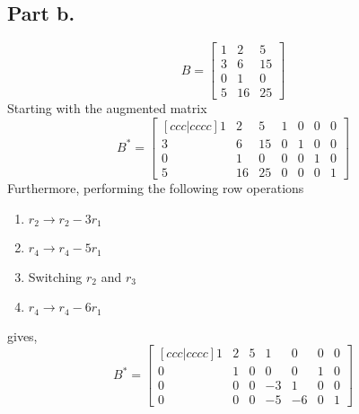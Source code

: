\subsection{Part b.}
\begin{equation}
    B =
    \begin{bmatrix}
        1           &           2       &       5   \\
        3           &           6       &       15  \\
        0           &           1       &       0   \\
        5           &           16      &       25  
    \end{bmatrix}
\end{equation}
Starting with the augmented matrix
\begin{equation}
    B^{\ast} =
    \begin{bmatrix}[ccc|cccc]
        1           &           2       &       5   &   1   &   0   &   0   &   0   \\
        3           &           6       &       15  &   0   &   1   &   0   &   0   \\   
        0           &           1       &       0   &   0   &   0   &   1   &   0   \\
        5           &           16      &       25  &   0   &   0   &   0   &   1
    \end{bmatrix}
\end{equation}
Furthermore, performing the following row operations
\begin{enumerate}[label=(\arabic*)]
    \item $r_{2} \rightarrow r_{2} - 3r_{1} $
    \item $r_{4} \rightarrow r_{4} - 5r_{1} $
    \item Switching $r_{2}$ and $r_{3}$
    \item $r_{4} \rightarrow r_{4} - 6r_{1}$
\end{enumerate}
gives,
\begin{equation}
    B^{\ast} =
    \begin{bmatrix}[ccc|cccc]
        1           &           2       &       5   &   1   &   0   &   0   &   0   \\
        0           &           1       &       0   &   0   &   0   &   1   &   0   \\   
        0           &           0       &       0   &   -3  &   1   &   0   &   0   \\
        0           &           0       &       0   &   -5  &   -6  &   0   &   1
    \end{bmatrix}
\end{equation}
